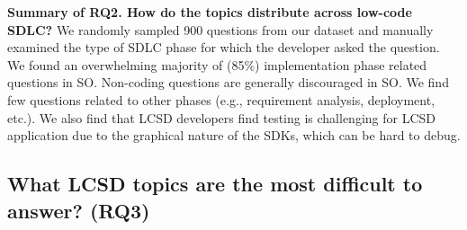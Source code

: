 \begin{tcolorbox}[flushleft upper,boxrule=1pt,arc=0pt,left=0pt,right=0pt,top=0pt,bottom=0pt,colback=white,after=\ignorespacesafterend\par\noindent]
\noindent\textbf{Summary of RQ2. How do the topics distribute across low-code SDLC?} We 
randomly sampled 900 questions from our dataset and manually examined the type of SDLC phase for which the developer asked the question. We found an overwhelming majority of (85\%) implementation phase related questions in SO. Non-coding questions are generally discouraged in SO. We find few questions related to other phases (e.g., requirement analysis, deployment, etc.). We also find that LCSD developers find testing is challenging for LCSD application due to the graphical nature of the SDKs, which can be hard to debug.
\end{tcolorbox}


\subsection{What LCSD topics are the most difficult to answer? (RQ3)}\label{sec:rq-topic-difficulty}


